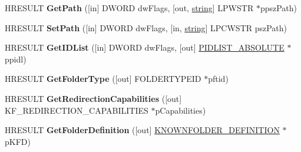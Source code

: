 \begin{DoxyCompactItemize}
\item 
\mbox{\label{interfacev1__enum_a3c641c15b5719656fc442555d67e1296}} 
H\+R\+E\+S\+U\+LT {\bfseries Get\+Path} (\mbox{[}in\mbox{]} D\+W\+O\+RD dw\+Flags, \mbox{[}out, \hyperlink{structstring}{string}\mbox{]} L\+P\+W\+S\+TR $\ast$ppsz\+Path)
\item 
\mbox{\label{interfacev1__enum_a217d48bb35cf0e49ae9e5f66f0fbc280}} 
H\+R\+E\+S\+U\+LT {\bfseries Set\+Path} (\mbox{[}in\mbox{]} D\+W\+O\+RD dw\+Flags, \mbox{[}in, \hyperlink{structstring}{string}\mbox{]} L\+P\+C\+W\+S\+TR psz\+Path)
\item 
\mbox{\label{interfacev1__enum_a37a2a611e4f763b6a0d2ac8ac7695d58}} 
H\+R\+E\+S\+U\+LT {\bfseries Get\+I\+D\+List} (\mbox{[}in\mbox{]} D\+W\+O\+RD dw\+Flags, \mbox{[}out\mbox{]} \hyperlink{struct___i_t_e_m_i_d_l_i_s_t___a_b_s_o_l_u_t_e}{P\+I\+D\+L\+I\+S\+T\+\_\+\+A\+B\+S\+O\+L\+U\+TE} $\ast$ppidl)
\item 
\mbox{\label{interfacev1__enum_a8ba74f80028215445eb592e8a123c5be}} 
H\+R\+E\+S\+U\+LT {\bfseries Get\+Folder\+Type} (\mbox{[}out\mbox{]} F\+O\+L\+D\+E\+R\+T\+Y\+P\+E\+ID $\ast$pftid)
\item 
\mbox{\label{interfacev1__enum_a869d906213e78a0c523f802f9cf78ba6}} 
H\+R\+E\+S\+U\+LT {\bfseries Get\+Redirection\+Capabilities} (\mbox{[}out\mbox{]} K\+F\+\_\+\+R\+E\+D\+I\+R\+E\+C\+T\+I\+O\+N\+\_\+\+C\+A\+P\+A\+B\+I\+L\+I\+T\+I\+ES $\ast$p\+Capabilities)
\item 
\mbox{\label{interfacev1__enum_a6bb9999132657e3bb0adf1dfbf848ef0}} 
H\+R\+E\+S\+U\+LT {\bfseries Get\+Folder\+Definition} (\mbox{[}out\mbox{]} \hyperlink{structtag_k_n_o_w_n_f_o_l_d_e_r___d_e_f_i_n_i_t_i_o_n}{K\+N\+O\+W\+N\+F\+O\+L\+D\+E\+R\+\_\+\+D\+E\+F\+I\+N\+I\+T\+I\+ON} $\ast$p\+K\+FD)
\end{DoxyCompactItemize}
